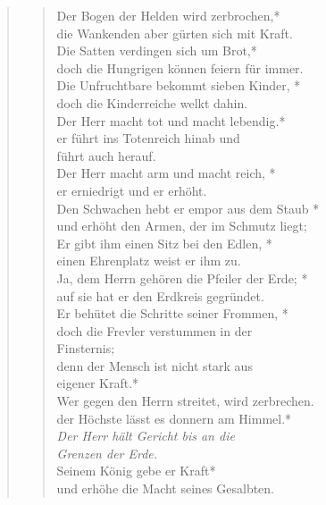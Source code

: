 \begin{quote}
\begin{verse}
\vin Der Bogen der Helden wird zerbrochen,*\\
\vin die Wankenden aber gürten sich mit Kraft.\\
Die Satten verdingen sich um Brot,*\\
doch die Hungrigen können feiern für immer.\\
\vin Die Unfruchtbare bekommt sieben Kinder, *\\
\vin doch die Kinderreiche welkt dahin.\\
Der Herr macht tot und macht lebendig.*\\
er führt ins Totenreich hinab und \\ führt auch herauf.\\
\vin Der Herr macht arm und macht reich, *\\
\vin er erniedrigt und er erhöht.\\
Den Schwachen hebt er empor aus dem Staub *\\
und erhöht den Armen, der im Schmutz liegt;\\ 
\vin Er gibt ihm einen Sitz bei den Edlen, *\\
\vin einen Ehrenplatz weist er ihm zu.\\
Ja, dem Herrn gehören die Pfeiler der Erde; *\\
auf sie hat er den Erdkreis gegründet.\\
\vin Er behütet die Schritte seiner Frommen, *\\
\vin doch die Frevler verstummen in der  \\ \vin  Finsternis; \\
denn der Mensch ist nicht stark aus \\eigener Kraft.*\\
Wer gegen den Herrn streitet, wird zerbrechen.\\
\vin der Höchste lässt es donnern am Himmel.*\\
\vin \textit{Der Herr hält Gericht bis an die \\ \vin  Grenzen der Erde.}\\
Seinem König gebe er Kraft*\\
und erhöhe die Macht seines Gesalbten.\\
\end{verse}

\end{quote}







\vspace{0.6cm}


